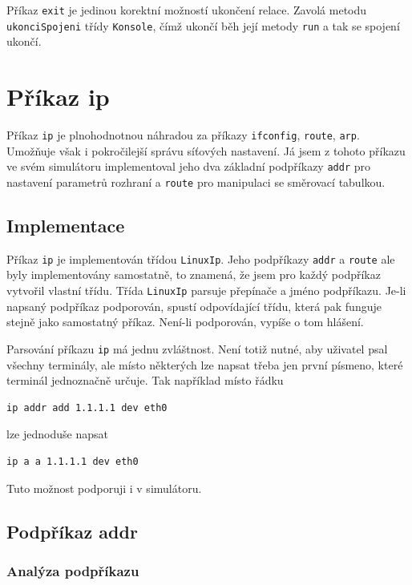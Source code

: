 Příkaz \verb|exit| je jedinou korektní možností ukončení relace. Zavolá metodu \verb|ukonciSpojeni| třídy \verb|Konsole|, čímž ukončí běh její metody \verb|run| a tak se spojení ukončí.




\section{Příkaz ip}

Příkaz \verb|ip| je plnohodnotnou náhradou za příkazy \verb|ifconfig|, \verb|route|, \verb|arp|. Umožňuje však i pokročilejší správu síťových nastavení\cite{prikaz_ip}. Já jsem z tohoto příkazu ve svém simulátoru implementoval jeho dva základní podpříkazy \verb|addr| pro nastavení parametrů rozhraní a \verb|route| pro manipulaci se směrovací tabulkou.


\subsection{Implementace}

Příkaz \verb|ip| je implementován třídou \verb|LinuxIp|. Jeho podpříkazy \verb|addr| a \verb|route| ale byly implementovány samostatně, to znamená, že jsem pro každý podpříkaz vytvořil vlastní třídu. Třída \verb|LinuxIp| parsuje přepínače a jméno podpříkazu. Je-li napsaný podpříkaz podporován, spustí odpovídající třídu, která pak funguje stejně jako samostatný příkaz. Není-li podporován, vypíše o tom hlášení.

Parsování příkazu \verb|ip| má jednu zvláštnost. Není totiž nutné, aby uživatel psal všechny terminály, ale místo některých lze napsat třeba jen první písmeno, které terminál jednoznačně určuje. Tak například místo řádku
\begin{verbatim}
ip addr add 1.1.1.1 dev eth0
\end{verbatim}
lze jednoduše napsat
\begin{verbatim}
ip a a 1.1.1.1 dev eth0
\end{verbatim}
Tuto možnost podporuji i v simulátoru.


\subsection{Podpříkaz addr}

\subsubsection{Analýza podpříkazu}

